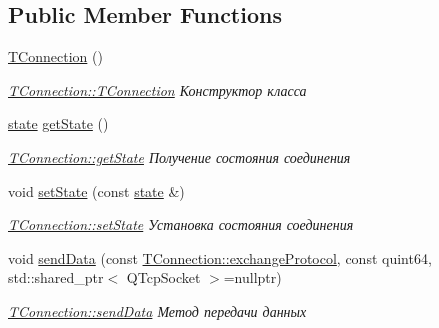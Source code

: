 \subsection*{Public Member Functions}
\begin{DoxyCompactItemize}
\item 
\mbox{\label{classconnection_1_1_t_connection_a3457e15061be61110b825fd1760e3834}} 
\hyperlink{classconnection_1_1_t_connection_a3457e15061be61110b825fd1760e3834}{T\+Connection} ()
\begin{DoxyCompactList}\small\item\em \hyperlink{classconnection_1_1_t_connection_a3457e15061be61110b825fd1760e3834}{T\+Connection\+::\+T\+Connection} Конструктор класса \end{DoxyCompactList}\item 
\hyperlink{classconnection_1_1_t_connection_aee7dfb7510592bd2697ab6f906b9612c}{state} \hyperlink{classconnection_1_1_t_connection_a23088724b46efeed0ae8d0d6b1e738b1}{get\+State} ()
\begin{DoxyCompactList}\small\item\em \hyperlink{classconnection_1_1_t_connection_a23088724b46efeed0ae8d0d6b1e738b1}{T\+Connection\+::get\+State} Получение состояния соединения \end{DoxyCompactList}\item 
void \hyperlink{classconnection_1_1_t_connection_ad87c4791bb1a08d97e4d4ae0b85c5d44}{set\+State} (const \hyperlink{classconnection_1_1_t_connection_aee7dfb7510592bd2697ab6f906b9612c}{state} \&)
\begin{DoxyCompactList}\small\item\em \hyperlink{classconnection_1_1_t_connection_ad87c4791bb1a08d97e4d4ae0b85c5d44}{T\+Connection\+::set\+State} Установка состояния соединения \end{DoxyCompactList}\item 
void \hyperlink{classconnection_1_1_t_connection_acf6af6c583b67379f8aa1efb4ab9e79e}{send\+Data} (const \hyperlink{classconnection_1_1_t_connection_a3550181cb2fa72eccfa55d23f45cea34}{T\+Connection\+::exchange\+Protocol}, const quint64, std\+::shared\+\_\+ptr$<$ Q\+Tcp\+Socket $>$=nullptr)
\begin{DoxyCompactList}\small\item\em \hyperlink{classconnection_1_1_t_connection_acf6af6c583b67379f8aa1efb4ab9e79e}{T\+Connection\+::send\+Data} Метод передачи данных \end{DoxyCompactList}\item 

\end{DoxyCompactItemize}

